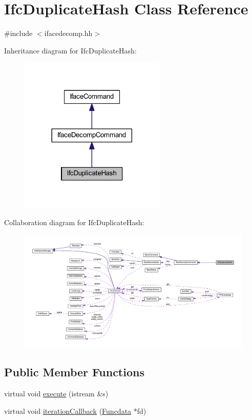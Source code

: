 \hypertarget{class_ifc_duplicate_hash}{}\section{Ifc\+Duplicate\+Hash Class Reference}
\label{class_ifc_duplicate_hash}


{\ttfamily \#include $<$ifacedecomp.\+hh$>$}



Inheritance diagram for Ifc\+Duplicate\+Hash\+:
\nopagebreak
\begin{figure}[H]
\begin{center}
\leavevmode
\includegraphics[width=197pt]{class_ifc_duplicate_hash__inherit__graph}
\end{center}
\end{figure}


Collaboration diagram for Ifc\+Duplicate\+Hash\+:
\nopagebreak
\begin{figure}[H]
\begin{center}
\leavevmode
\includegraphics[width=350pt]{class_ifc_duplicate_hash__coll__graph}
\end{center}
\end{figure}
\subsection*{Public Member Functions}
\begin{DoxyCompactItemize}
\item 
virtual void \mbox{\hyperlink{class_ifc_duplicate_hash_a8a4048b58da97771dcad39343e231b03}{execute}} (istream \&s)
\item 
virtual void \mbox{\hyperlink{class_ifc_duplicate_hash_a5459747ed3d0b946f717556fd9e40c08}{iteration\+Callback}} (\mbox{\hyperlink{class_funcdata}{Funcdata}} $\ast$fd)
\end{DoxyCompactItemize}
